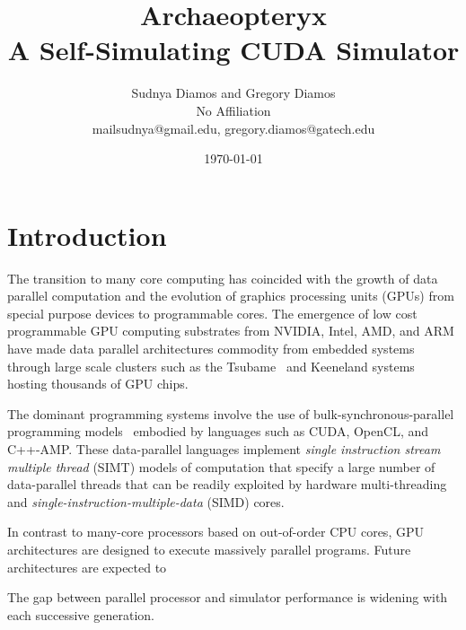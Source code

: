 \documentclass[conference, 12pt]{IEEEtran}
\begin{document}
 

\title{Archaeopteryx\\
A Self-Simulating CUDA Simulator}

\author{Sudnya Diamos and Gregory Diamos  \\
No Affiliation \\
{\small mailsudnya@gmail.edu, gregory.diamos@gatech.edu}}
\date{\today}

\maketitle

\section{Introduction}

The transition to many core computing has coincided with the growth of
data parallel computation and the evolution of graphics processing
units (GPUs) from special purpose devices to programmable cores. 
The emergence of low cost programmable GPU computing substrates from
NVIDIA, Intel, AMD, and ARM have made data parallel architectures commodity
from embedded systems through large scale clusters such as the
Tsubame~\cite{ref:tsubame} and Keeneland systems~\cite{ref:keeneland}
hosting thousands of GPU chips.

The dominant programming systems involve the use of
bulk-synchronous-parallel programming models~\cite{ref:bulk-synchronous}
embodied by languages such as CUDA, OpenCL, and C++-AMP.  These data-parallel
languages implement \textit{single instruction stream multiple thread} (SIMT)
models of computation that specify a large number of
data-parallel threads that can be readily exploited by hardware
multi-threading and \textit{single-instruction-multiple-data} (SIMD)
cores. 

In contrast to many-core processors based on out-of-order CPU cores,
GPU architectures are designed to execute massively parallel programs.  
Future architectures are expected to 

The gap between parallel processor and simulator performance is widening with
each successive generation.  
\end{document}
